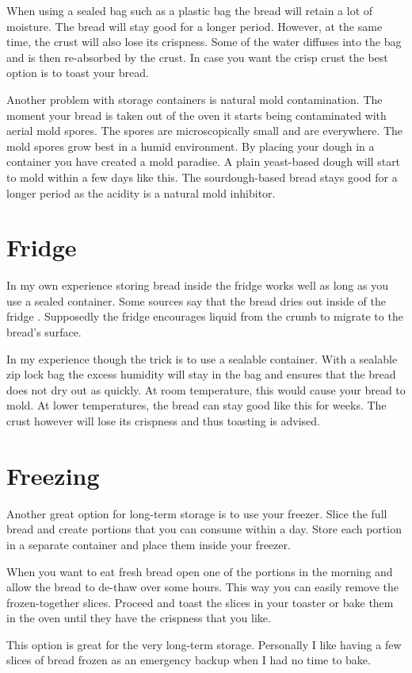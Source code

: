 When using a sealed bag such as a plastic bag the bread
will retain a lot of moisture. The bread will stay good
for a longer period. However, at the same time, the crust
will also lose its crispness. Some of the water diffuses
into the bag and is then re-absorbed by the crust. In case
you want the crisp crust the best option is to toast your
bread.

Another problem with storage containers is natural
mold contamination. The moment your bread is taken out of
the oven it starts being contaminated with aerial mold spores.
The spores are microscopically small and are everywhere.
The mold spores grow best in a humid environment. By placing
your dough in a container you have created a mold paradise.
A plain yeast-based dough will start to mold within a few days
like this. The sourdough-based bread stays good
for a longer period as the acidity is a natural mold
inhibitor.

\section{Fridge}

In my own experience storing bread inside the fridge
works well as long as you use a sealed container. Some
sources say that the bread dries out inside of the
fridge \cite{storing+bread}. Supposedly the fridge
encourages liquid from the crumb to migrate to the bread's surface.

In my experience though the trick is to use a sealable
container. With a sealable zip lock bag
the excess humidity will stay in the bag and ensures
that the bread does not dry out as quickly. At room
temperature, this would cause your bread to mold. At
lower temperatures, the bread can stay good like this for
weeks. The crust however will lose its crispness and
thus toasting is advised.

\section{Freezing}

Another great option for long-term storage is to use
your freezer. Slice the full bread and create portions
that you can consume within a day. Store each portion
in a separate container and place them inside your
freezer.

When you want to eat fresh bread open one of the portions
in the morning and allow the bread to de-thaw over some
hours. This way you can easily remove the frozen-together
slices. Proceed and toast the slices in your toaster
or bake them in the oven until they have the crispness
that you like.

This option is great for the very long-term storage. Personally
I like having a few slices of bread frozen as an emergency
backup when I had no time to bake.

